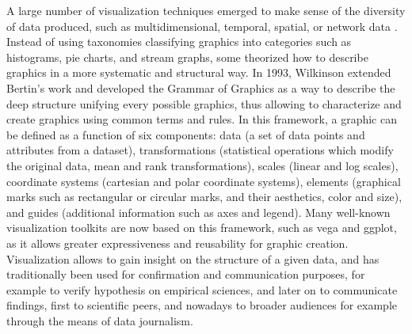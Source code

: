 A large number of visualization techniques emerged to make sense of the diversity of data produced, such as multidimensional, temporal, spatial, or network data \cite{shneidermanEyesHaveIt1996}.
Instead of using taxonomies classifying graphics into categories such as histograms, pie charts, and stream graphs, some theorized how to describe graphics in a more systematic and structural way.
In 1993, Wilkinson extended Bertin's work and developed the Grammar of Graphics \cite{wilkinsonGrammarGraphics1993} as a way to describe the deep structure unifying every possible graphics, thus allowing to characterize and create graphics using common terms and rules.
In this framework, a graphic can be defined as a function of six components: data (a set of data points and attributes from a dataset), transformations (statistical operations which modify the original data, \eg mean and rank transformations), scales (\eg linear and log scales), coordinate systems (\eg cartesian and polar coordinate systems), elements (graphical marks such as rectangular or circular marks, and their aesthetics, \eg color and size), and guides (additional information such as axes and legend).
Many well-known visualization toolkits are now based on this framework, such as vega\cite{satyanarayan2016vega} and ggplot\cite{wickham2007ggplot}, as it allows greater expressiveness and reusability for graphic creation.
Visualization allows to gain insight on the structure of a given data, and has traditionally been used for confirmation and communication purposes, for example to verify hypothesis on empirical sciences, and later on to communicate findings, first to scientific peers, and nowadays to broader audiences for example through the means of data journalism\cite{bradshawDataJournalism2017}.




